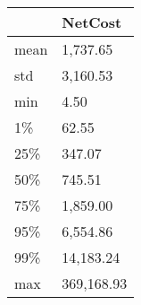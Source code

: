 \begin{tabular}{ll}
\toprule
{} &     NetCost \\
\midrule
mean &    1,737.65 \\
std  &    3,160.53 \\
min  &        4.50 \\
1\%   &       62.55 \\
25\%  &      347.07 \\
50\%  &      745.51 \\
75\%  &    1,859.00 \\
95\%  &    6,554.86 \\
99\%  &   14,183.24 \\
max  &  369,168.93 \\
\bottomrule
\end{tabular}
